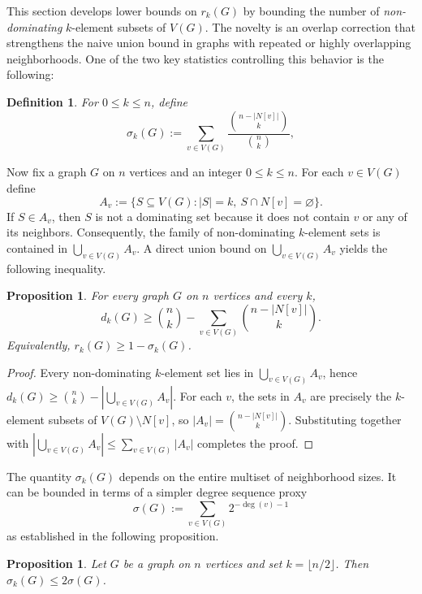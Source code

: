 \documentclass[11pt]{amsart}
\newtheorem{proposition}[theorem]{Proposition}
\newtheorem{definition}[theorem]{Definition}
\numberwithin{equation}{section}
\newcommand{\VV}{V(G)}
\begin{document}
This section develops lower bounds on $r_k(G)$ by bounding the number of \emph{non-dominating} $k$-element subsets of $\VV$. The novelty is an overlap correction that strengthens the naive union bound in graphs with repeated or highly overlapping neighborhoods. One of the two key statistics controlling this behavior is the following:
\begin{definition}\label{def:sigma_k}
For $0 \leq k \leq n$, define
\begin{equation}\label{eq:sigmaDef} 
\sigma_k(G):=\sum_{v\in\VV}\frac{\binom{n-|N[v]|}{k}}{\binom{n}{k}},
\end{equation}
\end{definition}

Now fix a graph $G$ on $n$ vertices and an integer $0\le k\le n$. For each $v\in\VV$ define
\[
A_v:=\{S\subseteq\VV:|S|=k,\ S\cap N[v]=\varnothing\}.
\]
If $S\in A_v$, then $S$ is not a dominating set because it does not contain $v$ or any of its neighbors. Consequently, the family of non-dominating $k$-element sets is contained in $\bigcup_{v\in\VV} A_v$. A direct union bound on $\bigcup_{v\in\VV} A_v$ yields the following inequality.

\begin{proposition}\label{prop:unionBound}
For every graph $G$ on $n$ vertices and every $k$, 
\[
\displaystyle d_k(G)\ge\binom{n}{k}-\sum_{v\in\VV} \binom{n-|N[v]|}{k}.
\] 
Equivalently, $r_k(G)\ge 1-\sigma_k(G)$.
\end{proposition}

\begin{proof}
Every non-dominating $k$-element set lies in $\bigcup_{v\in\VV} A_v$, hence $d_k(G) \ge \binom{n}{k}-\left|\bigcup_{v\in\VV}A_v\right|.$ For each $v$, the sets in $A_v$ are precisely the $k$-element subsets of $\VV\setminus N[v]$, so $|A_v|=\binom{n-|N[v]|}{k}$. Substituting together with $|\bigcup_{v \in \VV} A_v| \leq \sum_{v \in \VV} |A_v|$ completes the proof.
\end{proof}

The quantity $\sigma_k(G)$ depends on the entire multiset of neighborhood sizes. It can be bounded in terms of a simpler degree sequence proxy
\begin{equation}\label{eq:sigmaSmallDef}
\sigma(G):=\sum_{v\in\VV}2^{-\deg(v)-1}
\end{equation}
as established in the following proposition.

\begin{proposition}\label{prop:sigmaCompare}
Let $G$ be a graph on $n$ vertices and set $k=\lfloor n/2\rfloor$. Then $\sigma_k(G)\le 2\sigma(G)$.
\end{proposition}
\end{document}
